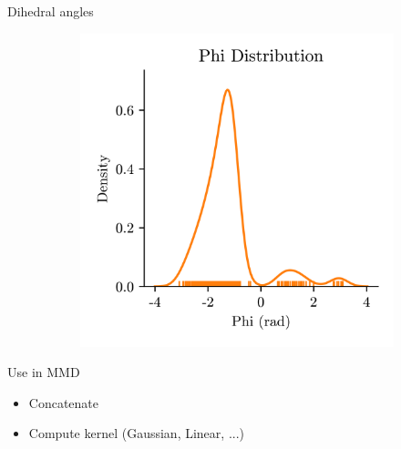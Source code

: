 \documentclass[aspectratio=169, 10pt, dvipsnames]{beamer}
\begin{document}
{\begin{frame}[fragile]{Dihedral angles}
\begin{minipage}{0.3\textwidth}
\begin{adjustbox}{minipage=\linewidth,scale=0.8}
\begin{figure}
\begin{subfigure}{\textwidth}
          \end{subfigure}
          \begin{subfigure}{\textwidth}
            \includegraphics[width=\textwidth]{./figures/dehedral_dist_phi.png}
          \end{subfigure}
        \end{figure}
      \end{adjustbox}
    \end{minipage}
    \pause\begin{minipage}{0.28\textwidth}
      \begin{alert}{Use in MMD}
        \begin{itemize}
        \item\small Concatenate
        \item\small Compute kernel (Gaussian, Linear, ...)
        \end{itemize}

      \end{alert}
    \end{minipage}
  \end{frame}
}
\end{document}
